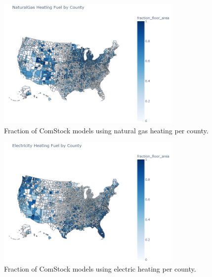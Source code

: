 \begin{figure}
  \centering
  \includegraphics[width=0.8\textwidth]{figures/map_naturalgas.png}
  \caption[Fraction of ComStock models using natural gas heating/water heating per county]{Fraction of ComStock models using natural gas heating per county.}
  \label{fig:map_naturalgas}
\end{figure}

\begin{figure}
  \centering
  \includegraphics[width=0.8\textwidth]{figures/map_electricity.png}
  \caption[Fraction of ComStock models using electric heating/water heating per county]{Fraction of ComStock models using electric heating per county.}
  \label{fig:map_electricity}
\end{figure}

